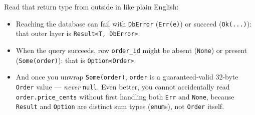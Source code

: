 Read that return type from outside in like plain English:
\begin{itemize}
  \item Reaching the database can fail with \texttt{DbError} (\texttt{Err(e)}) or succeed (\texttt{Ok(...)}): that outer layer is \texttt{Result<T, DbError>}.
  \item When the query succeeds, row \texttt{order\_id} might be absent (\texttt{None}) or present (\texttt{Some(order)}): that is \texttt{Option<Order>}.
  \item And once you unwrap \texttt{Some(order)}, \texttt{order} is a guaranteed-valid 32-byte \texttt{Order} value --- \emph{never} \texttt{null}. Even better, you cannot accidentally read \texttt{order.price\_cents} without first handling both \texttt{Err} and \texttt{None}, because \texttt{Result} and \texttt{Option} are distinct sum types (\texttt{enum}s), not \texttt{Order} itself.
\end{itemize}

